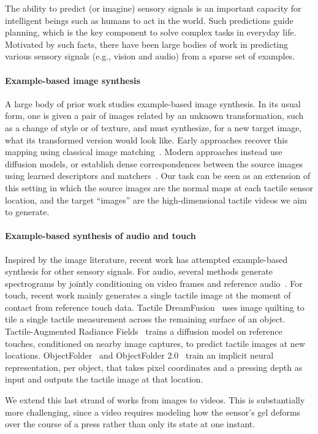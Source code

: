 The ability to predict (or imagine) sensory signals is an important capacity for intelligent beings such as humans to act in the world.
Such predictions guide planning, which is the key component to solve complex tasks in everyday life.
Motivated by such facts, there have been large bodies of work in predicting various sensory signals (e.g., vision and audio) from a sparse set of examples.

\paragraph{Example-based image synthesis}
A large body of prior work studies example-based image synthesis. In its usual form, one is given
a pair of images related by an unknown transformation, such as a change of style or of texture,
and must synthesize, for a new target image, what its transformed version would look like. Early
approaches recover this mapping using classical image matching~\cite{imageanalogies,patchmatch}.
Modern approaches instead use diffusion models, or establish dense correspondences between the
source images using learned descriptors and
matchers~\cite{ldm,lightglue,asic}. Our task can be seen as an extension of this
setting in which the source images are the normal maps at each tactile sensor location, and the
target ``images'' are the high-dimensional tactile videos we aim to generate.

\paragraph{Example-based synthesis of audio and touch}
Inspired by the image literature, recent work has attempted example-based synthesis for other
sensory signals. For audio, several methods generate spectrograms by jointly conditioning on
video frames and reference audio~\cite{foleyanalogies,foleycrafter,audiotextureanalogy}. For
touch, recent work mainly generates a single tactile image at the moment of contact from
reference touch data. Tactile DreamFusion~\cite{tactiledreamfusion} uses image quilting to tile a
single tactile measurement across the remaining surface of an object. Tactile-Augmented Radiance
Fields~\cite{tarf} trains a diffusion model on reference touches, conditioned on nearby image
captures, to predict tactile images at new locations. ObjectFolder~\cite{objectfolder} and
ObjectFolder 2.0~\cite{objectfolder2} train an implicit neural representation, per object, that
takes pixel coordinates and a pressing depth as input and outputs the tactile image at that
location.

We extend this last strand of works from images to videos. This is substantially more challenging, since a
video requires modeling how the sensor's gel deforms over the course of a press rather than only
its state at one instant.
